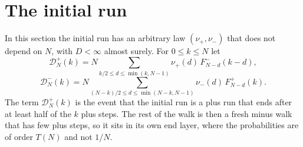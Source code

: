 \section{The initial run}\label{sec:initial}

In this section the initial run has an arbitrary law $(\nu_\plus,\nu_\minus)$ that does not
depend on $N$, with $D<\infty$ almost surely. For $0\le k\le N$ let
\[
 \mathcal D^\plus_N(k)=N\!\!\sum_{k/2\le d\le\min(k,N-1)}\!\!\nu_\plus(d)\,F^\minus_{N-d}(k-d),
\]
\[
 \mathcal D^\minus_N(k)=N\!\!\sum_{(N-k)/2\le d\le\min(N-k,N-1)}\!\!\nu_\minus(d)\,F^\plus_{N-d}(k).
\]
The term $\mathcal D^\plus_N(k)$ is the event that the initial run is a plus run that ends
after at least half of the $k$ plus steps. The rest of the walk is then a fresh minus walk
that has few plus steps, so it sits in its own end layer, where the probabilities are of
order $T(N)$ and not $1/N$.

